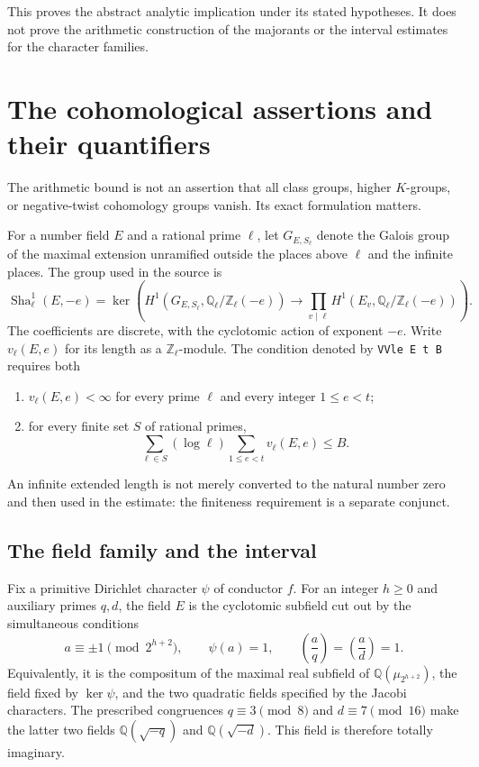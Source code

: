 \documentclass[11pt,a4paper]{article}
\theoremstyle{remark}
\newcommand{\Z}{\mathbb Z}
\newcommand{\Q}{\mathbb Q}
\DeclareMathOperator{\Sha}{Sha}
\newcommand{\src}[1]{\cite{#1}}
\newcommand{\code}[1]{\texttt{#1}}
\begin{document}
This proves the abstract analytic implication under its stated
hypotheses. It does not prove the arithmetic construction of the
majorants or the interval estimates for the character families.

\section{The cohomological assertions and their quantifiers}\label{sec:cohomology}
The arithmetic bound is not an assertion that all class groups, higher $K$-groups, or negative-twist cohomology groups vanish. Its exact formulation matters.

For a number field $E$ and a rational prime $\ell$, let $G_{E,S_\ell}$ denote the Galois group of the maximal extension unramified outside the places above $\ell$ and the infinite places. The group used in the source is
\[
 \Sha^1_\ell(E,-e)=
 \ker\left(
 H^1(G_{E,S_\ell},\Q_\ell/\Z_\ell(-e))
 \longrightarrow
 \prod_{v\mid\ell}H^1(E_v,\Q_\ell/\Z_\ell(-e))
 \right).
\]
The coefficients are discrete, with the cyclotomic action of exponent $-e$. Write $v_\ell(E,e)$ for its length as a $\Z_\ell$-module. The condition denoted by \code{VVle E t B} requires both
\begin{enumerate}
\item $v_\ell(E,e)<\infty$ for every prime $\ell$ and every integer $1\le e<t$;
\item for every finite set $S$ of rational primes,
\[
 \sum_{\ell\in S}(\log\ell)
       \sum_{1\le e<t}v_\ell(E,e)\le B.
\]
\end{enumerate}
An infinite extended length is not merely converted to the natural number zero and then used in the estimate: the finiteness requirement is a separate conjunct. \src{S-cohomology,S-vwin}

\subsection{The field family and the interval}
Fix a primitive Dirichlet character $\psi$ of conductor $f$. For an integer $h\ge0$ and auxiliary primes $q,d$, the field $E$ is the cyclotomic subfield cut out by the simultaneous conditions
\[
 a\equiv\pm1\pmod{2^{h+2}},\qquad
 \psi(a)=1,\qquad
 \left(\frac aq\right)=\left(\frac ad\right)=1.
\]
Equivalently, it is the compositum of the maximal real subfield of
$\Q(\mu_{2^{h+2}})$, the field fixed by $\ker\psi$, and the two quadratic fields specified by the Jacobi characters. The prescribed congruences
$q\equiv3\pmod8$ and $d\equiv7\pmod{16}$ make the latter two fields
$\Q(\sqrt{-q})$ and $\Q(\sqrt{-d})$. This field is therefore totally imaginary.
\end{document}
